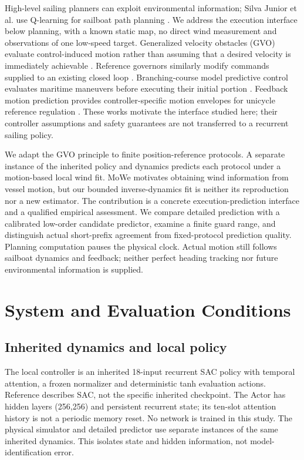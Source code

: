 \documentclass[conference]{IEEEtran}
\begin{document}
High-level sailing planners can exploit environmental information; Silva Junior et al. use Q-learning for sailboat path planning \cite{ref1}. We address the execution interface below planning, with a known static map, no direct wind measurement and observations of one low-speed target. Generalized velocity obstacles (GVO) evaluate control-induced motion rather than assuming that a desired velocity is immediately achievable \cite{ref2}. Reference governors similarly modify commands supplied to an existing closed loop \cite{ref3}. Branching-course model predictive control evaluates maritime maneuvers before executing their initial portion \cite{ref6}. Feedback motion prediction provides controller-specific motion envelopes for unicycle reference regulation \cite{ref7}. These works motivate the interface studied here; their controller assumptions and safety guarantees are not transferred to a recurrent sailing policy.

We adapt the GVO principle to finite position-reference protocols. A separate instance of the inherited policy and dynamics predicts each protocol under a motion-based local wind fit. MoWe \cite{ref4} motivates obtaining wind information from vessel motion, but our bounded inverse-dynamics fit is neither its reproduction nor a new estimator. The contribution is a concrete execution-prediction interface and a qualified empirical assessment. We compare detailed prediction with a calibrated low-order candidate predictor, examine a finite guard range, and distinguish actual short-prefix agreement from fixed-protocol prediction quality. Planning computation pauses the physical clock. Actual motion still follows sailboat dynamics and feedback; neither perfect heading tracking nor future environmental information is supplied.

\section{System and Evaluation Conditions}

\subsection{Inherited dynamics and local policy}

The local controller is an inherited 18-input recurrent SAC policy with temporal attention, a frozen normalizer and deterministic tanh evaluation actions. Reference \cite{ref5} describes SAC, not the specific inherited checkpoint. The Actor has hidden layers (256,256) and persistent recurrent state; its ten-slot attention history is not a periodic memory reset. No network is trained in this study. The physical simulator and detailed predictor use separate instances of the same inherited dynamics. This isolates state and hidden information, not model-identification error.
\end{document}
